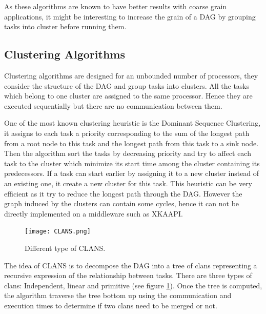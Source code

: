 \documentclass[10pt, conference, compsocconf,pdftex,dvipsnames]{IEEEtran}
\begin{document}
As these algorithms are known to have better results with coarse grain
applications, it might be interesting to increase the grain of a DAG by
grouping tasks into cluster before running them.

\subsection{Clustering Algorithms}

Clustering algorithms are designed for an unbounded number of processors, they
consider the structure of the DAG and group tasks into clusters. All the tasks
which belong to one cluster are assigned to the same processor. Hence they are
executed sequentially but there are no communication between them.  

One of the most known clustering heuristic is the Dominant Sequence
Clustering\cite{yang1994dsc}, it assigns to each task a priority corresponding
to the sum of the longest path from a root node to this task and the longest
path from this task to a sink node. Then the algorithm sort the tasks by
decreasing priority and try to affect each task to the cluster which minimize
its start time among the cluster containing its predecessors. If a task can
start earlier by assigning it to a new cluster instead of an existing one, it
create a new cluster for this task. This heuristic can be very efficient as it
try to reduce the longest path through the DAG. However the graph induced by
the clusters can contain some cycles, hence it can not be directly implemented
on a middleware such as XKAAPI.

\begin{figure}[htb]
    \centering
    \texttt{[image: CLANS.png]}
    \caption{Different type of CLANS.}
    \label{fig:clans}
\end{figure}

The idea of CLANS
\cite{aubum1990efficient,mccreary1993partitioning,mccreary1993graph} is to
decompose the DAG into a tree of clans representing a recursive expression of
the relationship between tasks. 
There are three types of clans:
Independent, linear and primitive (see figure \ref{fig:clans}). Once the tree
is computed, the algorithm traverse the tree bottom up using the communication
and execution times to determine if two clans need to be merged or not.
\end{document}
